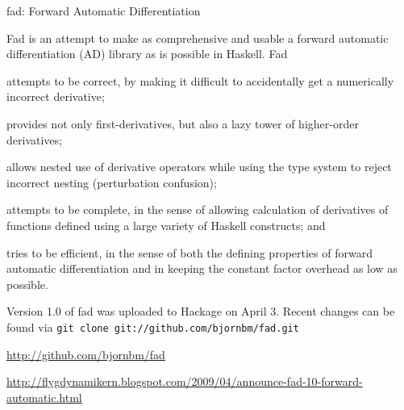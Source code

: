 \begin{hcarentry}[new]{fad: Forward Automatic Differentiation}
\makeheader

Fad is an attempt to make as comprehensive and usable a forward
automatic differentiation (AD) library as is possible in Haskell.  Fad
\begin{inparaenum}[(a)]
\item attempts to be correct, by making it difficult to accidentally
  get a numerically incorrect derivative;
\item provides not only first-derivatives, but also a lazy tower of
  higher-order derivatives;
\item allows nested use of derivative operators while using the type
  system to reject incorrect nesting (perturbation confusion);
\item attempts to be complete, in the sense of allowing calculation of
  derivatives of functions defined using a large variety of Haskell
  constructs; and
\item tries to be efficient, in the sense of both the defining
  properties of forward automatic differentiation and in keeping the
  constant factor overhead as low as possible.
\end{inparaenum}

Version 1.0 of fad was uploaded to Hackage on April 3. Recent changes
can be found via \texttt{git clone git://github.com/bjornbm/fad.git}

\FurtherReading
\begin{compactitem}
\item \url{http://github.com/bjornbm/fad}
\item \url{http://flygdynamikern.blogspot.com/2009/04/announce-fad-10-forward-automatic.html}
\end{compactitem}
\end{hcarentry}
